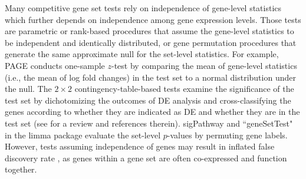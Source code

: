\documentclass[a4,center,fleqn]{NAR}
\newcommand{\gen}{geneSetTest}
\begin{document}
	Many competitive gene set tests rely on independence of gene-level statistics which further depends
	on independence among gene expression levels. Those tests are parametric or rank-based procedures
	that assume the gene-level statistics to be independent and identically distributed, or gene
	permutation procedures that generate the same approximate null for the set-level statistics. For
	example, PAGE  \citep{kim2005page} conducts one-sample $z$-test by comparing the mean of gene-level
	statistics (i.e., the mean of log fold changes) in the test set to a normal distribution under the
	null. The $2\times 2$ contingency-table-based tests examine the significance of the test set by
	dichotomizing the outcomes of DE analysis and cross-classifying the genes according to whether they
	are indicated as DE and whether they are in the test set (see \cite{huang2009bioinformatics} for a
	review and references therein). sigPathway \citep{tian2005discovering} and ``\gen" in the limma
	package \citep{Smyth2004moderated} evaluate the set-level $p$-values by permuting gene labels.
	However, tests assuming independence of genes may result in inflated false discovery rate
	\citep{efron2007testing,goeman2007analyzing, gatti2010heading,wu2012camera,yaari2013quantitative},
	as genes within a gene set are often co-expressed and function together.
	
\end{document}
